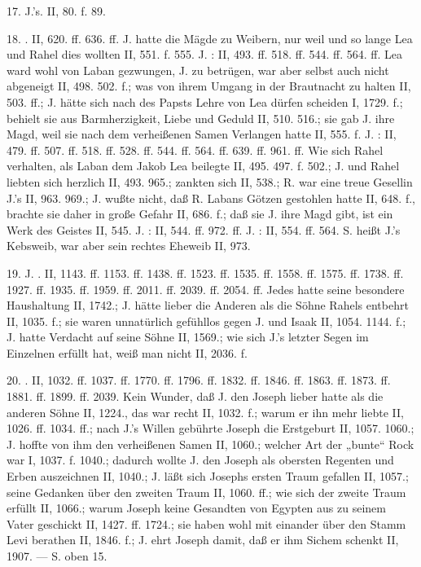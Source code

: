 17.  J.’s. II, 80. f. 89.

18. . II, 620. ff. 636. ff. J. hatte die Mägde zu Weibern, nur weil und so lange Lea und Rahel dies wollten II, 551. f. 555. J. : II, 493. ff. 518. ff. 544. ff. 564. ff. Lea ward wohl von Laban gezwungen, J. zu betrügen, war aber selbst auch nicht abgeneigt II, 498. 502. f.; was von ihrem Umgang in der Brautnacht zu halten II, 503. ff.; J. hätte sich nach des Papsts Lehre von Lea dürfen scheiden I, 1729. f.; behielt sie aus Barmherzigkeit, Liebe und Geduld II, 510. 516.; sie gab J. ihre Magd, weil sie nach dem verheißenen Samen Verlangen hatte II, 555. f. J. : II, 479. ff. 507. ff. 518. ff. 528. ff. 544. ff. 564. ff. 639. ff. 961. ff. Wie sich Rahel verhalten, als Laban dem Jakob Lea beilegte II, 495. 497. f. 502.; J. und Rahel liebten sich herzlich II, 493. 965.; zankten sich II, 538.; R. war eine treue Gesellin J.’s II, 963. 969.; J. wußte nicht, daß R. Labans Götzen gestohlen hatte II, 648. f., brachte sie daher in große Gefahr II, 686. f.; daß sie J. ihre Magd gibt, ist ein Werk des Geistes II, 545. J. : II, 544. ff. 972. ff. J. : II, 554. ff. 564.
S. heißt J.’s Kebsweib, war aber sein rechtes Eheweib II, 973.

19. J. . II, 1143. ff. 1153. ff. 1438. ff. 1523. ff. 1535. ff. 1558. ff. 1575. ff. 1738. ff. 1927. ff. 1935. ff. 1959. ff. 2011. ff. 2039. ff. 2054. ff. Jedes hatte seine besondere Haushaltung II, 1742.; J. hätte lieber die Anderen als die Söhne Rahels entbehrt II, 1035. f.; sie waren unnatürlich gefühllos gegen J. und Isaak II, 1054. 1144. f.; J. hatte Verdacht auf seine Söhne II, 1569.; wie sich J.’s letzter Segen im Einzelnen erfüllt hat, weiß man nicht II, 2036. f.

20. . II, 1032. ff. 1037. ff. 1770. ff. 1796. ff. 1832. ff. 1846. ff. 1863. ff. 1873. ff. 1881. ff. 1899. ff. 2039. Kein Wunder, daß J. den Joseph lieber hatte als die anderen Söhne II, 1224., das war recht II, 1032. f.; warum er ihn mehr liebte II, 1026. ff. 1034. ff.; nach J.’s Willen gebührte Joseph die Erstgeburt II, 1057. 1060.; J. hoffte von ihm den verheißenen Samen II, 1060.; welcher Art der „bunte“ Rock war I, 1037. f. 1040.; dadurch wollte J. den Joseph als obersten Regenten und Erben auszeichnen II, 1040.; J. läßt sich Josephs ersten Traum gefallen II, 1057.; seine Gedanken über den zweiten Traum II, 1060. ff.; wie sich der zweite Traum erfüllt II, 1066.; warum Joseph keine Gesandten von Egypten aus zu seinem Vater geschickt II, 1427. ff. 1724.; sie haben wohl mit einander über den Stamm Levi berathen II, 1846. f.; J. ehrt Joseph damit, daß er ihm Sichem schenkt II, 1907. — S. oben 15.


